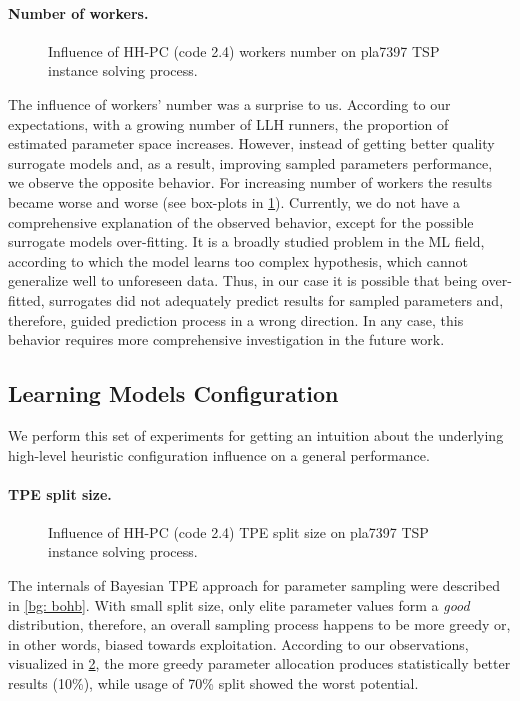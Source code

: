 \paragraph{Number of workers.}
\begin{figure}[h]
	\centering
	\vspace{-20pt}
	
	\caption{Influence of HH-PC (code 2.4) workers number on pla7397 TSP instance solving process.}
	\vspace{-5pt}
	\label{eval:2:pict:number of workers}
\end{figure}
The influence of workers' number was a surprise to us. According to our expectations, with a growing number of LLH runners, the proportion of estimated parameter space increases. However, instead of getting better quality surrogate models and, as a result, improving sampled parameters performance, we observe the opposite behavior. For increasing number of workers the results became worse and worse (see box-plots in \cref{eval:2:pict:number of workers}). Currently, we do not have a comprehensive explanation of the observed behavior, except for the possible surrogate models over-fitting. It is a broadly studied problem in the ML field, according to which the model learns too complex hypothesis, which cannot generalize well to unforeseen data. Thus, in our case it is possible that being over-fitted, surrogates did not adequately predict results for sampled parameters and, therefore, guided prediction process in a wrong direction. In any case, this behavior requires more comprehensive investigation in the future work.

\subsection{Learning Models Configuration}\label{eval:2:learning models}
We perform this set of experiments for getting an intuition about the underlying high-level heuristic configuration influence on a general performance.

\paragraph{TPE split size.}
\begin{figure}[b]
	\centering
	\vspace{-10pt}
	
	\caption{Influence of HH-PC (code 2.4) TPE split size on pla7397 TSP instance solving process.}
	\vspace{-5pt}
	\label{eval:2:pict:tpe split size}
\end{figure}
The internals of Bayesian TPE approach for parameter sampling were described in \cref{bg: bohb}. With small split size, only elite parameter values form a \emph{good} distribution, therefore, an overall sampling process happens to be more greedy or, in other words, biased towards exploitation. According to our observations, visualized in \cref{eval:2:pict:tpe split size}, the more greedy parameter allocation produces statistically better results (10\%), while usage of 70\% split showed the worst potential.

